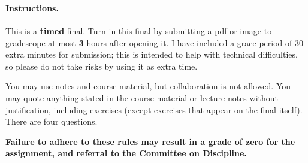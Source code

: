 \documentclass[12pt]{article}
\begin{document}

 \\
~\\

\paragraph{Instructions.} This is a {\bf timed} final. Turn in this final by submitting a pdf or image to gradescope at most \textbf{3} hours after opening it. I have included a grace period of 30 extra minutes for submission; this is intended to help with technical difficulties, so please do not take risks by using it as extra time.

 You may use notes and course material, but collaboration is not allowed. You may quote anything stated in the course material or lecture notes without justification, including exercises (except exercises that appear on the final itself). There are four questions.

\textbf{Failure to adhere to these rules may result in a grade of zero for the assignment, and referral to the Committee on Discipline.}
\end{document}
